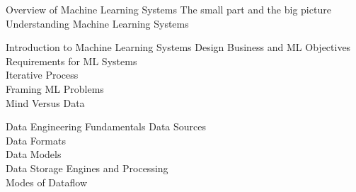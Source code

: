 
\makeatletter

\newcommand{\outlinetitle}[1]{\csname td@lt@#1\endcsname}
\newcommand{\outlineitems}[1]{\csname td@lo@#1\endcsname}

\newcommand{\td@setlecture}[3]{%
  \expandafter\gdef\csname td@lt@#1\endcsname{#2}%
  \expandafter\gdef\csname td@lo@#1\endcsname{#3}%
}

\td@setlecture{I}{Overview of Machine Learning Systems}{%
  The small part and the big picture\\[0.2em]
  Understanding Machine Learning Systems\\[0.2em]
}

\td@setlecture{II}{Introduction to Machine Learning Systems Design}{%
  Business and ML Objectives\\[0.2em]
  Requirements for ML Systems\\[0.2em]
  Iterative Process\\[0.2em]
  Framing ML Problems\\[0.2em]
  Mind Versus Data\\[0.2em]
}

\td@setlecture{III}{Data Engineering Fundamentals}{%
  Data Sources\\[0.2em]
  Data Formats\\[0.2em]
  Data Models\\[0.2em]
  Data Storage Engines and Processing\\[0.2em]
  Modes of Dataflow\\[0.2em]
}

